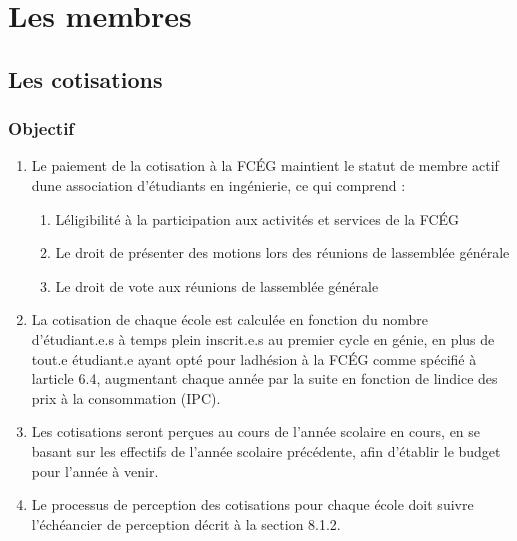 \section{Les membres}
\label{les-membres}

\subsection{Les cotisations}
\label{les-cotisations}

\subsubsection{Objectif}
\label{objectif}

\begin{enumerate}
 \item
  Le paiement de la cotisation à la FCÉG maintient le statut de membre actif d\textquotesingle une association d'étudiants en ingénierie, ce qui comprend :

  \begin{enumerate}
   \item
    L\textquotesingle éligibilité à la participation aux activités et services de la FCÉG
   \item
    Le droit de présenter des motions lors des réunions de l\textquotesingle assemblée générale
   \item
    Le droit de vote aux réunions de l\textquotesingle assemblée générale
  \end{enumerate}
 \item La cotisation de chaque école est calculée en fonction du nombre d'étudiant.e.s à temps plein inscrit.e.s au premier cycle en génie, en plus de tout.e étudiant.e ayant opté pour l\textquotesingle adhésion à la FCÉG comme spécifié à l\textquotesingle article 6.4, augmentant chaque année par la suite en fonction de l\textquotesingle indice des prix à la consommation (IPC).
 \item Les cotisations seront perçues au cours de l'année scolaire en cours, en se basant sur les effectifs de l'année scolaire précédente, afin d'établir le budget pour l'année à venir.
 \item Le processus de perception des cotisations pour chaque école doit suivre l’échéancier de perception décrit à la section 8.1.2.
\end{enumerate}

